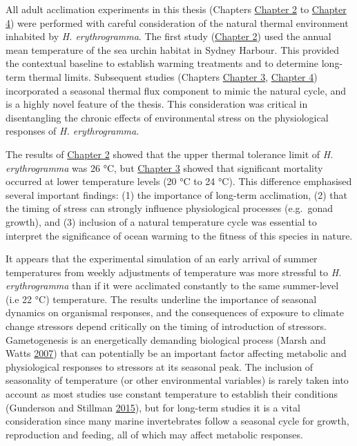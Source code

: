 \documentclass[a4paper,10pt, oneside]{memoir}
\begin{document}
All adult acclimation experiments in this thesis (Chapters \protect\hyperlink{warming}{Chapter 2} to \protect\hyperlink{transgen}{Chapter 4}) were performed with careful consideration of the natural thermal environment inhabited by \emph{H. erythrogramma}.
The first study (\protect\hyperlink{warming}{Chapter 2}) used the annual mean temperature of the sea urchin habitat in Sydney Harbour.
This provided the contextual baseline to establish warming treatments and to determine long-term thermal limits.
Subsequent studies (Chapters \protect\hyperlink{multistressor}{Chapter 3}, \protect\hyperlink{transgen}{Chapter 4}) incorporated a seasonal thermal flux component to mimic the natural cycle, and is a highly novel feature of the thesis.
This consideration was critical in disentangling the chronic effects of environmental stress on the physiological responses of \emph{H. erythrogramma}.

The results of \protect\hyperlink{warming}{Chapter 2} showed that the upper thermal tolerance limit of \emph{H. erythrogramma} was 26 °C, but \protect\hyperlink{multistressor}{Chapter 3} showed that significant mortality occurred at lower temperature levels (20 °C to 24 °C).
This difference emphasised several important findings: (1) the importance of long-term acclimation, (2) that the timing of stress can strongly influence physiological processes (e.g.~gonad growth), and (3) inclusion of a natural temperature cycle was essential to interpret the significance of ocean warming to the fitness of this species in nature.

It appears that the experimental simulation of an early arrival of summer temperatures from weekly adjustments of temperature was more stressful to \emph{H. erythrogramma} than if it were acclimated constantly to the same summer-level (i.e 22 °C) temperature.
The results underline the importance of seasonal dynamics on organismal responses, and the consequences of exposure to climate change stressors depend critically on the timing of introduction of stressors.
Gametogenesis is an energetically demanding biological process (Marsh and Watts \protect\hyperlink{ref-Marsh2007}{2007}) that can potentially be an important factor affecting metabolic and physiological responses to stressors at its seasonal peak.
The inclusion of seasonality of temperature (or other environmental variables) is rarely taken into account as most studies use constant temperature to establish their conditions (Gunderson and Stillman \protect\hyperlink{ref-Gunderson2015}{2015}), but for long-term studies it is a vital consideration since many marine invertebrates follow a seasonal cycle for growth, reproduction and feeding, all of which may affect metabolic responses.
\end{document}
